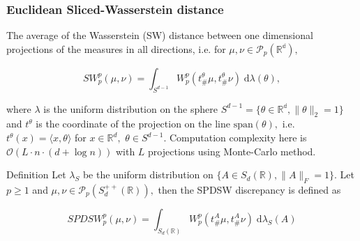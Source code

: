 \documentclass{beamer}
\begin{document}
\begin{frame}
\frametitle{Euclidean Sliced-Wasserstein distance}

The average of the Wasserstein (SW) distance between one dimensional projections of the measures in all directions, i.e. for $\mu, \nu \in \mathcal{P}_p(\mathbb{R^d}),$

\begin{equation}
	SW_p^p(\mu, \nu) = \int_{S^{d-1}} W_p^p(t_{\#}^{\theta} \mu, t_{\#}^{\theta} \nu)\; \mathrm{d} \lambda(\theta),
	\label{eq:ESWd}
\end{equation}

where $\lambda$ is the uniform distribution on the sphere $S^{d-1} = \{\theta \in \mathbb{R^d}, \lVert \theta \rVert_2 = 1\}$ and $t^{\theta}$ is the coordinate of the projection on the line $\text{span}(\theta),$ i.e. $t^{\theta}(x) = \langle x, \theta \rangle$ for $x \in \mathbb{R}^d,$ $\theta \in S^{d-1}$. Computation complexity here is $\mathcal{O}(L \cdot n \cdot (d + \log n))$ with $L$ projections using Monte-Carlo method.

\begin{block}{Definition}
	Let $\lambda_S$ be the uniform distribution on $\{A \in S_d(\mathbb{R}), \lVert A \rVert_F = 1\}$. Let $p \ge 1$ and $\mu, \nu \in \mathcal{P}_p(S_d^{++}(\mathbb{R})),$ then the SPDSW discrepancy is defined as
	
	\begin{equation}
		SPDSW_p^p(\mu, \nu) = \int_{S_d(\mathbb{R})} W_p^p(t_{\#}^{A} \mu, t_{\#}^{A} \nu)\; \mathrm{d} \lambda_{S}(A)
		\label{eq:ESWd}
	\end{equation}
\end{block}
\end{frame}
%
%
%
\end{document}
